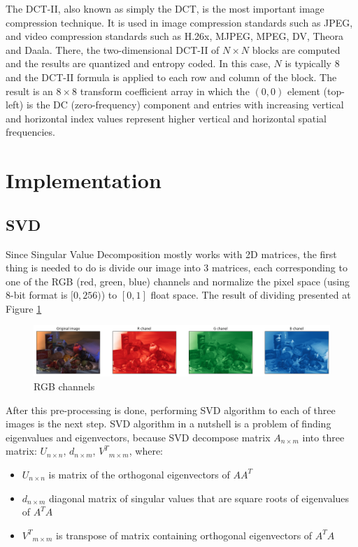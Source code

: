 The DCT-II, also known as simply the DCT, is the most important image compression technique. It is used in image compression standards such as JPEG, and video compression standards such as H.26x, MJPEG, MPEG, DV, Theora and Daala. There, the two-dimensional DCT-II of $N \times N$ blocks are computed and the results are quantized and entropy coded. In this case, $N$ is typically $8$ and the DCT-II formula is applied to each row and column of the block. The result is an $8 \times 8$ transform coefficient array in which the $(0,0)$ element (top-left) is the DC (zero-frequency) component and entries with increasing vertical and horizontal index values represent higher vertical and horizontal spatial frequencies.

\section{Implementation}

\subsection{SVD}

Since Singular Value Decomposition mostly works with 2D matrices, the first thing is needed to do is divide our image into 3 matrices, each corresponding to one of the RGB (red, green, blue) channels and normalize the pixel space (using 8-bit format is $[0, 256)$) to $[0, 1]$ float space. The result of dividing presented at Figure \ref{fig:rgb}

\begin{figure}[H]
  \centering
  \includegraphics[width=\linewidth]{rgb_chanels.png}
  \caption{RGB channels}
  \label{fig:rgb}
\end{figure}

After this pre-processing is done, performing SVD algorithm to each of three images is the next step. SVD algorithm in a nutshell is a problem of finding eigenvalues and eigenvectors, because SVD decompose matrix $A_{n \times m}$ into three matrix: $U_{n \times n}$, $d_{n \times m}$, ${V^T}_{m \times m}$, where:

\begin{itemize}
  \item $U_{n \times n}$ is matrix of the orthogonal eigenvectors of $AA^T$
  \item $d_{n \times m}$ diagonal matrix of singular values that are square roots of eigenvalues of $A^TA$ 
  \item ${V^T}_{m \times m}$ is transpose of matrix containing orthogonal eigenvectors of $A^TA$
\end{itemize}

